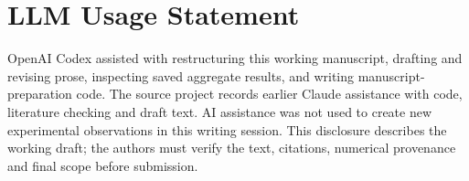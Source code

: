 \documentclass[10pt,twocolumn,letterpaper]{article}
\begin{document}
\clearpage
\section*{LLM Usage Statement}
OpenAI Codex assisted with restructuring this working manuscript, drafting and revising prose, inspecting saved aggregate results, and writing manuscript-preparation code. The source project records earlier Claude assistance with code, literature checking and draft text. AI assistance was not used to create new experimental observations in this writing session. This disclosure describes the working draft; the authors must verify the text, citations, numerical provenance and final scope before submission.

{\small


}
\end{document}

